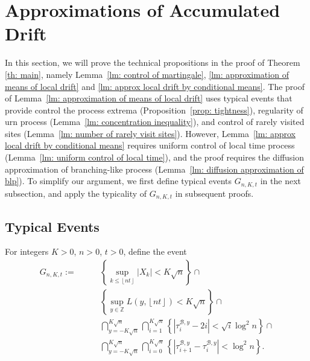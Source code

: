\documentclass[EJP]{ejpecp} %
\begin{document}
\section{Approximations of Accumulated Drift}\label{sec: approximations}

In this section, we will prove the technical propositions in the proof of Theorem \ref{th: main}, namely Lemma~\ref{lm: control of martingale}, \ref{lm: approximation of means of local drift} and \ref{lm: approx local drift by conditional means}. 
The proof of Lemma~\ref{lm: approximation of means of local drift} uses typical events that provide control the process extrema (Proposition~\ref{prop: tightness}), regularity of urn process (Lemma~\ref{lm: concentration inequality}), and control of rarely visited sites (Lemma~\ref{lm: number of rarely visit sites}). 
However, Lemma~\ref{lm: approx local drift by conditional means} requires uniform control of local time process (Lemma~\ref{lm: uniform control of local time}), and the proof requires the diffusion approximation of branching-like process (Lemma~\ref{lm: diffusion approximation of blp}).
To simplify our argument, we first define typical events $G_{n, K, t}$ in the next subsection, and apply the typicality of $G_{n, K, t}$ in subsequent proofs.

\subsection{Typical Events}

For integers $K>0$, $n > 0$, $t>0$, define the event
\begin{align}
	G_{n,K,t} :=  \qquad
	\label{eq:good-event-1}
	& \left\{\sup _{k \le \left\lfloor nt  \right\rfloor} |X_k| < K \sqrt{n} \right\} \cap \\
	\label{eq:good-event-2}
	& \left\{\sup_{y \in \mathbb{Z}} L(y, \left\lfloor nt  \right\rfloor) < K \sqrt{n} \right\} \cap \\
	\label{eq:good-event-3}
	& \bigcap_{y = - K \sqrt{n} }^{K \sqrt{n}} 
	\bigcap_{i = 1}^{K \sqrt{n} } \left\{\left| \tau_i^{\mathcal{B},y} - 2 i \right| < \sqrt{ i } \log^2 n \right\}  \cap \\
	\label{eq:good-event-4}
	& \bigcap_{y = - K \sqrt{n} }^{K \sqrt{n}} 
	\bigcap_{i = 0}^{K \sqrt{n} } \left\{\left| \tau_{i+1}^{\mathcal{B},y} - \tau_i^{\mathcal{B},y} \right| < \log^2 n \right\}  
	.\end{align}
\end{document}
